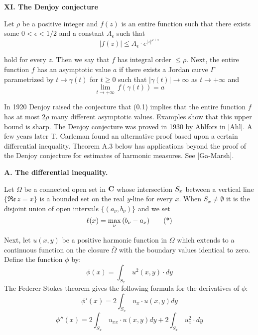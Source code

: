 








%



\centerline{\bf\large{XI. The Denjoy conjecture}}

\bigskip

Let $\rho$ be a positive integer and 
$f(z)$  is an entire function such that there exists some
$0<\epsilon<1/2 $  and a constant $A_\epsilon$ such that
\[
|f(z)|\leq A_\epsilon\cdot e^{|z|^{\rho+\epsilon}}\tag{0.1}
\]


\noindent
hold for every $z$. Then we say that 
$f$ has integral order $\leq\rho$.
Next, the entire function $f$ has an asymptotic value $a$
if there exists a Jordan curve
$\Gamma$ parametrized
by
$t\mapsto\gamma(t)$ for $t\geq 0$ such that
$|\gamma(t)|\to \infty$ as $t\to+\infty$ and
\[
\lim_{t\to+\infty}\, f(\gamma(t))=a\tag{0.2}
\]


\noindent
In 1920 Denjoy raised the conjecture that
(0.1) implies that the entire function $f$ has at most
$2\rho$ many different asymptotic values. Examples show that
this upper bound is sharp.
The Denjoy conjecture was proved in 1930 by  Ahlfors in [Ahl].
A few years later T. Carleman found an alternative  proof based
upon a certain differential inequality.
Theorem A.3 below 
has  applications beyond the proof of
the Denjoy conjecture
for estimates of
harmonic measures. See [Ga-Marsh].

\bigskip

\centerline{\bf A. The  differential inequality.}
\bigskip


\noindent
Let $\Omega$ be a connected open set in ${\bf{C}}$ whose
intersection $S_ x$ between
a  vertical line  $\{\mathfrak{Re}\, z=x\}$
is a bounded set
on the real $y$-line for every $x$.
When $S_x\neq\emptyset $ it is the disjoint union
of open
intervals $\{(a_\nu,b_\nu)\}$ and we set
\[ 
\ell(x)=\max_ \nu \,(b_\nu-a_\nu)\tag{*}
\]

\medskip


\noindent
Next, let
$u(x,y)$ be a positive harmonic   function
in $\Omega$ which 
extends to a continuous function on
the closure $\bar\Omega$  with the boundary values identical to zero.
Define the function $\phi$ by:
\[ 
\phi(x)=\int_{S_x}\,u^2(x,y)\cdot dy\tag{1}
\]
The Federer-Stokes theorem gives
the following  formula for the derivatives of $\phi$:
\[ 
\phi'(x)=2\int_{S_x}\,u_x\cdot u(x,y) dy\tag{2}
\]
\[
\phi''(x)=2\int_{S_x}\,u_{xx}\cdot u(x,y) dy+
2\int_{S_x}\,u^2_x\cdot dy\tag{3}
\]


